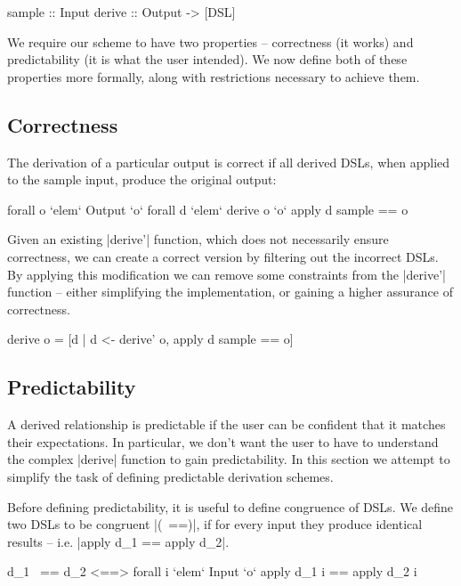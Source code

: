 \documentclass{llncs}
\begin{document}
\begin{code}
sample  :: Input
derive  :: Output -> [DSL]
\end{code}

We require our scheme to have two properties -- correctness (it works) and predictability (it is what the user intended). We now define both of these properties more formally, along with restrictions necessary to achieve them.

\subsection{Correctness}
\label{sec:correctness}

The derivation of a particular output is correct if all derived DSLs, when applied to the sample input, produce the original output:

\ignore\begin{code}
forall o `elem` Output `o` forall d `elem` derive o `o` apply d sample == o
\end{code}

Given an existing |derive'| function, which does not necessarily ensure correctness, we can create a correct version by filtering out the incorrect DSLs. By applying this modification we can remove some constraints from the |derive'| function -- either simplifying the implementation, or gaining a higher assurance of correctness.

\begin{code}
derive o = [d | d <- derive' o, apply d sample == o]
\end{code}

\subsection{Predictability}

A derived relationship is predictable if the user can be confident that it matches their expectations. In particular, we don't want the user to have to understand the complex |derive| function to gain predictability. In this section we attempt to simplify the task of defining predictable derivation schemes.

Before defining predictability, it is useful to define congruence of DSLs. We define two DSLs to be congruent |(~==)|, if for every input they produce identical results -- i.e. |apply d_1 == apply d_2|.

\ignore\begin{code}
d_1 ~== d_2 <==> forall i `elem` Input `o` apply d_1 i == apply d_2 i
\end{code}
\end{document}
